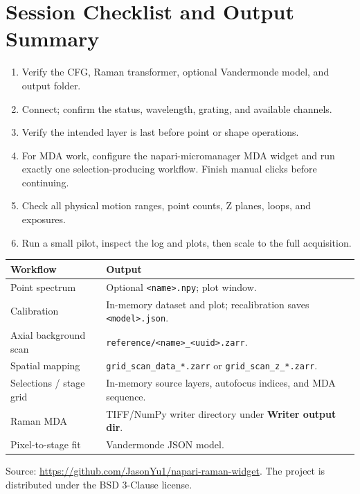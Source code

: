 \documentclass[11pt,oneside]{report}
\newcommand{\ui}[1]{\textbf{#1}}
\newcommand{\code}[1]{\texttt{#1}}
\begin{document}
\chapter{Session Checklist and Output Summary}
\begin{enumerate}
  \item Verify the CFG, Raman transformer, optional Vandermonde model, and output folder.
  \item Connect; confirm the status, wavelength, grating, and available channels.
  \item Verify the intended layer is last before point or shape operations.
  \item For MDA work, configure the napari-micromanager MDA widget and run exactly one
        selection-producing workflow. Finish manual clicks before continuing.
  \item Check all physical motion ranges, point counts, Z planes, loops, and exposures.
  \item Run a small pilot, inspect the log and plots, then scale to the full acquisition.
\end{enumerate}

\begin{longtable}{@{}p{}p{}@{}}
\toprule\textbf{Workflow} & \textbf{Output}\\\midrule
Point spectrum & Optional \code{<name>.npy}; plot window.\\
Calibration & In-memory dataset and plot; recalibration saves \code{<model>.json}.\\
Axial background scan & \code{reference/<name>\_<uuid>.zarr}.\\
Spatial mapping & \code{grid\_scan\_data\_*.zarr} or \code{grid\_scan\_z\_*.zarr}.\\
Selections / stage grid & In-memory source layers, autofocus indices, and MDA sequence.\\
Raman MDA & TIFF/NumPy writer directory under \ui{Writer output dir}.\\
Pixel-to-stage fit & Vandermonde JSON model.\\\bottomrule
\end{longtable}

Source: \url{https://github.com/JasonYu1/napari-raman-widget}. The project is
distributed under the BSD 3-Clause license.
\end{document}
